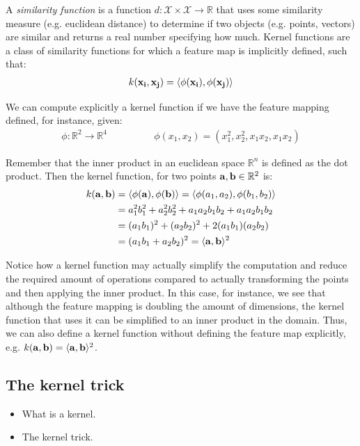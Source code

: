 A \emph{similarity function} is a function $d : \mathcal{X \times X} \rightarrow \mathbb{R}$ that uses some similarity measure (e.g. euclidean distance) to determine if two objects (e.g. points, vectors) are similar and returns a real number specifying how much. Kernel functions are a class of similarity functions for which a feature map is implicitly defined, such that:
\begin{align}
    k(\mathbf{x_i}, \mathbf{x_j}) = \langle\phi(\mathbf{x_i}), \phi(\mathbf{x_j})\rangle
\end{align}

We can compute explicitly a kernel function if we have the feature mapping defined, for instance, given:
\begin{align*}
    \phi : \mathbb{R}^2 \rightarrow \mathbb{R}^4 &
    \qquad\qquad
    \phi(x_1, x_2) = (x_1^2, x_2^2, x_1x_2, x_1x_2)
\end{align*}

Remember that the inner product in an euclidean space $\mathbb{R}^n$ is defined as the dot product. Then the kernel function, for two points $\mathbf{a}, \mathbf{b} \in \mathbb{R}^2$ is:
\begin{align*}
    k(\mathbf{a}, \mathbf{b}) &= \langle\phi(\mathbf{a}), \phi(\mathbf{b})\rangle = \langle\phi(a_1, a_2), \phi(b_1, b_2)\rangle \\
    &= a_1^2b_1^2 + a_2^2b_2^2 + a_1a_2b_1b_2 + a_1a_2b_1b_2 \\
    &= (a_1b_1)^2 + (a_2b_2)^2 + 2(a_1b_1)(a_2b_2) \\
    &= (a_1b_1 + a_2b_2)^2 = \langle\mathbf{a}, \mathbf{b}\rangle^2
\end{align*}

Notice how a kernel function may actually simplify the computation and reduce the required amount of operations compared to actually transforming the points and then applying the inner product. In this case, for in\-stance, we see that although the feature mapping is doubling the amount of di\-men\-sions, the kernel function that uses it can be simplified to an inner product in the domain. Thus, we can also define a kernel function without defining the feature map explicitly, e.g. $k(\mathbf{a}, \mathbf{b}) = \langle\mathbf{a}, \mathbf{b}\rangle^2$.

\subsection{The kernel trick}


\begin{itemize}
    \item What is a kernel.
    \item The kernel trick.
\end{itemize}

